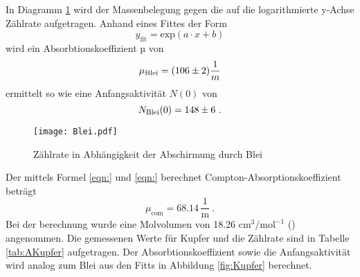 In Diagramm \ref{fig:Blei} wird der Massenbelegung gegen die auf die logarithmierte y-Achse Zählrate aufgetragen. Anhand eines Fittes der Form 
\begin{equation}
  y_\text{fit} = \text{exp}(a \cdot x + b) 
  \label{eqn:fit}
\end{equation} 
wird ein Absorbtionskoeffizient µ von 
\begin{equation}
  \mu_\text{Blei} = (\num{106 +- 2}) \frac{1}{m}
  \label{eqn:absK}
\end{equation}
ermittelt so wie eine Anfangsaktivität $N(0)$ von 
\begin{equation}
  N_\text{Blei}(0) = \num{148 +- 6} \ .
  \label{eqn:NBlei}
\end{equation}
\begin{figure}
  \centering
  \texttt{[image: Blei.pdf]}
  \caption{Zählrate in Abhängigkeit der Abschirmung durch Blei}
  \label{fig:Blei}
\end{figure}
Der mittels Formel \ref{eqn:} und \ref{eqn:} berechnet Compton-Absorptionskoeffizient beträgt
\begin{equation}
  \mu_\text{com} = 68.14 \, \frac{1}{\text{m}} \ .
  \label{eqn:}
\end{equation}
Bei der berechnung wurde eine Molvolumen von 18.26 $\text{cm}^3 / \text{mol}^{-1}$ (\cite{Kupfer}) angenommen.
Die gemessenen Werte für Kupfer und die Zählrate sind in Tabelle \ref{tab:AKupfer} aufgetragen. Der Absorbtionskoeffizient sowie die Anfangsaktivität wird analog zum Blei aus den Fitts in Abbildung \ref{fig:Kupfer} berechnet. 
